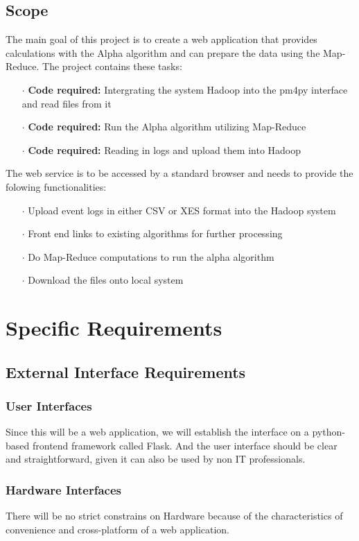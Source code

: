 \documentclass[runningheads]{llncs}
\begin{document}
\subsection{Scope}
The main goal of this project is to create a web application that provides calculations with the Alpha algorithm and can prepare the data using the Map-Reduce. The project contains these tasks:
\begin{itemize}
	\item[\Large $\cdot$] \textbf{Code required:} Intergrating the system Hadoop into the pm4py interface and read files from it
	\item[\Large $\cdot$] \textbf{Code required:} Run the Alpha algorithm utilizing Map-Reduce 
	\item[\Large $\cdot$] \textbf{Code required:} Reading in logs and upload them into Hadoop
\end{itemize}
The web service is to be accessed by a standard browser and needs to provide the folowing functionalities:
\begin{itemize}
	\item[\Large $\cdot$] Upload event logs in either CSV or XES format into the Hadoop system
	\item[\Large $\cdot$] Front end links to existing algorithms for further processing
	\item[\Large $\cdot$] Do Map-Reduce computations to run the alpha algorithm
	\item[\Large $\cdot$] Download the files onto local system
\end{itemize}

\section{Specific Requirements}

\subsection{External Interface Requirements}
\subsubsection{User Interfaces}
Since this will be a web application, we will establish the interface on a python-based frontend framework called Flask. And the user interface should be clear and straightforward, given it can also be used by non IT professionals.

\subsubsection{Hardware Interfaces}
There will be no strict constrains on Hardware because of the characteristics of convenience and cross-platform of a web application.
\end{document}
